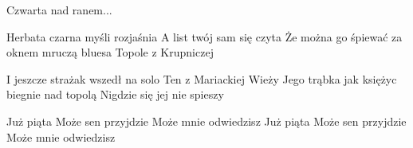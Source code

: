 \documentclass[../../../songbook.tex]{subfiles}
\begin{document}
\-\hspace{1cm} Czwarta nad ranem... 			\newline

Herbata czarna myśli rozjaśnia 			\newline
A list twój sam się czyta 			\newline
Że można go śpiewać za oknem mruczą bluesa 			\newline
Topole z Krupniczej			\newline

I jeszcze strażak wszedł na solo 			\newline
Ten z Mariackiej Wieży 			\newline
Jego trąbka jak księżyc biegnie nad topolą 			\newline
Nigdzie się jej nie spieszy 			\newline

\-\hspace{1cm} Już piąta 			\newline
\-\hspace{1cm} Może sen przyjdzie 			\newline
\-\hspace{1cm} Może mnie odwiedzisz 			\newline
\-\hspace{1cm} Już piąta 			\newline
\-\hspace{1cm} Może sen przyjdzie 			\newline
\-\hspace{1cm} Może mnie odwiedzisz 		
\end{document}
